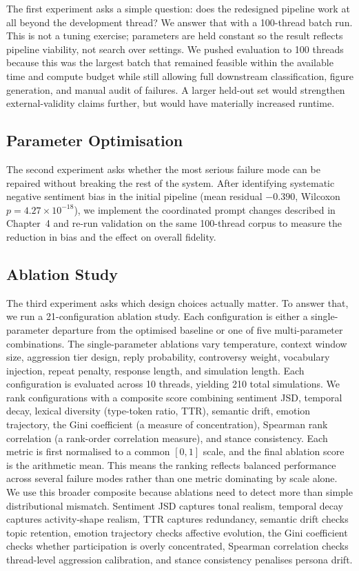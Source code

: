 \documentclass[logo,bsc,singlespacing,parskip,online]{infthesis}
\begin{document}
The first experiment asks a simple question: does the redesigned pipeline work at all beyond the development thread? We answer that with a 100-thread batch run. This is not a tuning exercise; parameters are held constant so the result reflects pipeline viability, not search over settings. We pushed evaluation to 100 threads because this was the largest batch that remained feasible within the available time and compute budget while still allowing full downstream classification, figure generation, and manual audit of failures. A larger held-out set would strengthen external-validity claims further, but would have materially increased runtime.

\subsection{Parameter Optimisation}

The second experiment asks whether the most serious failure mode can be repaired without breaking the rest of the system. After identifying systematic negative sentiment bias in the initial pipeline (mean residual $-0.390$, Wilcoxon $p = 4.27 \times 10^{-18}$), we implement the coordinated prompt changes described in Chapter~4 and re-run validation on the same 100-thread corpus to measure the reduction in bias and the effect on overall fidelity.

\subsection{Ablation Study}

The third experiment asks which design choices actually matter. To answer that, we run a 21-configuration ablation study. Each configuration is either a single-parameter departure from the optimised baseline or one of five multi-parameter combinations. The single-parameter ablations vary temperature, context window size, aggression tier design, reply probability, controversy weight, vocabulary injection, repeat penalty, response length, and simulation length. Each configuration is evaluated across 10 threads, yielding 210 total simulations. We rank configurations with a composite score combining sentiment JSD, temporal decay, lexical diversity (type-token ratio, TTR), semantic drift, emotion trajectory, the Gini coefficient (a measure of concentration), Spearman rank correlation (a rank-order correlation measure), and stance consistency. Each metric is first normalised to a common $[0,1]$ scale, and the final ablation score is the arithmetic mean. This means the ranking reflects balanced performance across several failure modes rather than one metric dominating by scale alone. We use this broader composite because ablations need to detect more than simple distributional mismatch. Sentiment JSD captures tonal realism, temporal decay captures activity-shape realism, TTR captures redundancy, semantic drift checks topic retention, emotion trajectory checks affective evolution, the Gini coefficient checks whether participation is overly concentrated, Spearman correlation checks thread-level aggression calibration, and stance consistency penalises persona drift.
\end{document}
